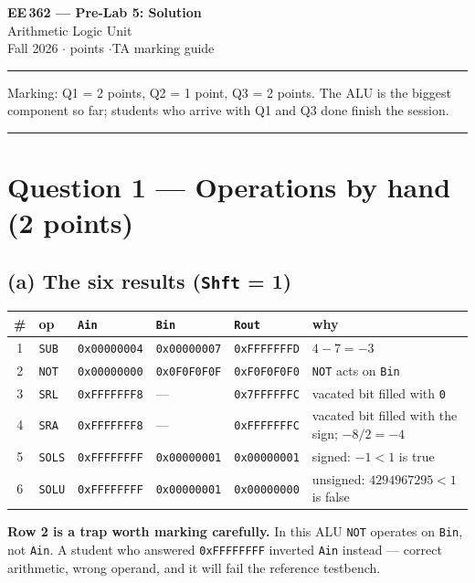 \documentclass[11pt]{article}
\newcommand{\code}[1]{\texttt{#1}}
\newcommand{\hr}{\vspace{2pt}\hrule\vspace{6pt}}
\begin{document}
\begin{center}
{\Large\bfseries EE\,362 --- Pre-Lab 5: Solution}\\[2pt]
{\large Arithmetic Logic Unit}\\[4pt]
Fall 2026 \quad$\cdot$ points \quad$\cdot$\quad TA marking guide
\end{center}
\hr

{\small Marking: Q1 = 2 points, Q2 = 1 point, Q3 = 2 points. The ALU is the
biggest component so far; students who arrive with Q1 and Q3 done finish the
session.}

\vspace{4pt}\hr

\section*{Question 1 --- Operations by hand (2 points)}

\subsection*{(a) The six results \quad(\code{Shft} = 1)}

\begin{center}
\begin{tabular}{clll|l|l}
\toprule
\# & op & \code{Ain} & \code{Bin} & \code{Rout} & why \\
\midrule
1 & \code{SUB}  & \code{0x00000004} & \code{0x00000007} & \code{0xFFFFFFFD} & $4-7 = -3$ \\
2 & \code{NOT}  & \code{0x00000000} & \code{0x0F0F0F0F} & \code{0xF0F0F0F0} & \code{NOT} acts on \code{Bin} \\
3 & \code{SRL}  & \code{0xFFFFFFF8} & --- & \code{0x7FFFFFFC} & vacated bit filled with \code{0} \\
4 & \code{SRA}  & \code{0xFFFFFFF8} & --- & \code{0xFFFFFFFC} & vacated bit filled with the sign; $-8/2 = -4$ \\
5 & \code{SOLS} & \code{0xFFFFFFFF} & \code{0x00000001} & \code{0x00000001} & signed: $-1 < 1$ is true \\
6 & \code{SOLU} & \code{0xFFFFFFFF} & \code{0x00000001} & \code{0x00000000} & unsigned: $4294967295 < 1$ is false \\
\bottomrule
\end{tabular}
\end{center}

\textbf{Row 2 is a trap worth marking carefully.} In this ALU \code{NOT} operates
on \code{Bin}, not \code{Ain}. A student who answered \code{0xFFFFFFFF} inverted
\code{Ain} instead --- correct arithmetic, wrong operand, and it will fail the
reference testbench.
\end{document}
